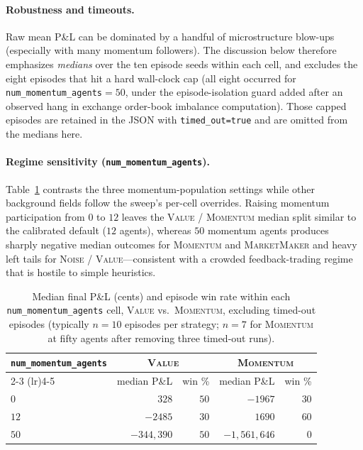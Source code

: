 \documentclass[11pt]{article}
\begin{document}
\paragraph{Robustness and timeouts.}
Raw mean P\&L can be dominated by a handful of microstructure blow-ups (especially with many momentum
followers). The discussion below therefore emphasizes \emph{medians} over the ten episode seeds within each
cell, and excludes the eight episodes that hit a hard wall-clock cap (all eight occurred for
\texttt{num\_momentum\_agents}${}=50$, under the episode-isolation guard added after an observed hang in
exchange order-book imbalance computation). Those capped episodes are retained in the JSON with
\texttt{timed\_out=true} and are omitted from the medians here.

\paragraph{Regime sensitivity (\texttt{num\_momentum\_agents}).}
Table~\ref{tab:sweep-mom} contrasts the three momentum-population settings while other background fields
follow the sweep's per-cell overrides. Raising momentum participation from $0$ to $12$ leaves the
\textsc{Value} / \textsc{Momentum} median split similar to the calibrated default ($12$ agents), whereas
$50$ momentum agents produces sharply negative median outcomes for \textsc{Momentum} and
\textsc{MarketMaker} and heavy left tails for \textsc{Noise} / \textsc{Value}---consistent with a crowded
feedback-trading regime that is hostile to simple heuristics.

\begin{table}[h]
\centering
\begin{tabular}{lrrrr}
\toprule
\texttt{num\_momentum\_agents} &
\multicolumn{2}{c}{\textsc{Value}} &
\multicolumn{2}{c}{\textsc{Momentum}} \\
\cmidrule(lr){2-3} \cmidrule(lr){4-5}
& median P\&L & win \% & median P\&L & win \% \\
\midrule
$0$   & $328$   & $50$ & $-1967$ & $30$ \\
$12$  & $-2485$ & $30$ & $1690$  & $60$ \\
$50$  & $-344{,}390$ & $50$ & $-1{,}561{,}646$ & $0$ \\
\bottomrule
\end{tabular}
\caption{Median final P\&L (cents) and episode win rate within each \texttt{num\_momentum\_agents} cell,
\textsc{Value} vs.\ \textsc{Momentum}, excluding timed-out episodes (typically $n=10$ episodes per
strategy; $n=7$ for \textsc{Momentum} at fifty agents after removing three timed-out runs).}
\label{tab:sweep-mom}
\end{table}
\end{document}
